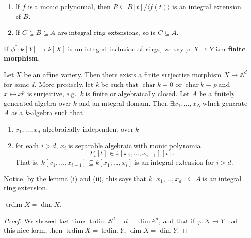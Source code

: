\documentclass{article}
\newcommand{\A}{\mathbb{A}}
\DeclareMathOperator{\chara}{char}
\DeclareMathOperator{\trdim}{trdim}
\begin{document}
\begin{lemma}\leavevmode
    \begin{enumerate}[label=(\roman*)]
        \item If $f$ is a monic polynomial, then $B \subseteq B[t]/\langle f(t) \rangle$ is an \hyperlink{def:intExt}{integral extension} of $B$.
        \item If $C \subseteq B \subseteq A$ are integral ring extensions, so is $C \subseteq A$.
    \end{enumerate}
\end{lemma}
\begin{defi}
    If $\phi^*: k[Y] \to k[X]$ is an \hyperlink{def:intExt}{integral inclusion} of rings, we say $\varphi: X \to Y$ is a \textbf{finite morphism}.
\end{defi}
\begin{thm}
    Let $X$ be an affine variety. Then there exists a finite surjective morphism $X \to \A^d$ for some $d$.
    More precisely, let $k$ be such that $\chara k = 0$ or $\chara k = p$ and $x \mapsto x^p$ is surjective, e.g.\ $k$ is finite or algebraically closed.
    Let $A$ be a finitely generated algebra over $k$ and an integral domain. Then $\exists x_1, \dotsc, x_N$ which generate $A$ as a $k$-algebra such that
    \begin{enumerate}[label=(\roman*)]
        \item $x_1, \dotsc, x_d$ algebraically independent over $k$
        \item for each $i > d$, $x_i$ is separable algebraic with monic polynomial
            \begin{equation*}F_i[t] \in k[x_1, \dotsc, x_{i-1}][t].\end{equation*} That is, $k[x_1, \dotsc, x_{i-1}] \subseteq k[x_1, \dotsc, x_i]$ is an integral extension for $i > d$.
    \end{enumerate}
\end{thm}
Notice, by the lemma (i) and (ii), this says that $k[x_1, \dotsc, x_d] \subseteq A$ is an integral ring extension.
\begin{cor}
    $\trdim X = \dim X$.
\end{cor}
\color{gray}
\begin{proof}
    We showed last time $\trdim \A^d = d = \dim \A^d$, and that if $\varphi: X \to Y$ had this nice form, then $\trdim X = \trdim Y$, $\dim X = \dim Y$.
\end{proof}
\end{document}
